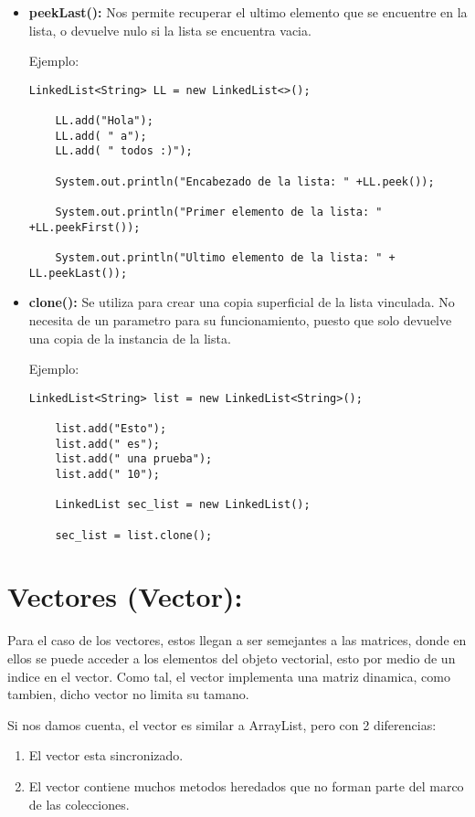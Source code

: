 \documentclass[12pt, letterpaper]{article} %
\begin{document}
\begin{itemize}
    \item \textbf{peekLast():} Nos permite recuperar el ultimo elemento que se encuentre en la lista, o devuelve nulo si la lista se encuentra vacia.

    Ejemplo:
    \lstset{language = Java, breaklines=true, basicstyle=\footnotesize}
    \begin{lstlisting}[frame=single]
    LinkedList<String> LL = new LinkedList<>();

    LL.add("Hola");  
    LL.add( " a");
    LL.add( " todos :)");

    System.out.println("Encabezado de la lista: " +LL.peek());

    System.out.println("Primer elemento de la lista: " +LL.peekFirst());

    System.out.println("Ultimo elemento de la lista: " + LL.peekLast());
    \end{lstlisting}

    \item \textbf{clone():} Se utiliza para crear una copia superficial de la lista vinculada. No necesita de un parametro para su funcionamiento, puesto que solo devuelve una copia de la instancia de la lista.

    Ejemplo:
    \lstset{language = Java, breaklines=true, basicstyle=\footnotesize}
    \begin{lstlisting}[frame=single]
    LinkedList<String> list = new LinkedList<String>();

    list.add("Esto");
    list.add(" es");
    list.add(" una prueba");
    list.add(" 10");

    LinkedList sec_list = new LinkedList();

    sec_list = list.clone();
    \end{lstlisting}
    
\end{itemize}

\section{Vectores (Vector):}
Para el caso de los vectores, estos llegan a ser semejantes a las matrices, donde en ellos se puede acceder a los elementos del objeto vectorial, esto por medio de un indice en el vector. Como tal, el vector implementa una matriz dinamica, como tambien, dicho vector no limita su tamano.

Si nos damos cuenta, el vector es similar a ArrayList, pero con 2 diferencias:
\begin{enumerate}
    \item El vector esta sincronizado.
    \item El vector contiene muchos metodos heredados que no forman parte del marco de las colecciones.
\end{enumerate}
\end{document}

